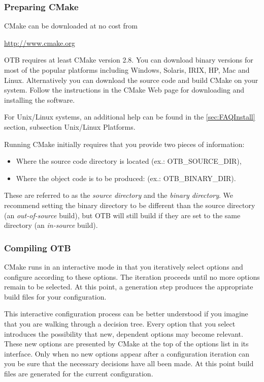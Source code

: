 \subsubsection{Preparing CMake}
\label{sec:CMakeforOTB}


CMake can be downloaded at no cost from
\begin{center}
  \url{http://www.cmake.org}
\end{center}

OTB requires at least CMake version 2.8. You can download binary
versions for most of the popular platforms including Windows, Solaris,
IRIX, HP, Mac and Linux. Alternatively you can download the source
code and build CMake on your system. Follow the instructions in the
CMake Web page for downloading and installing the software.

For Unix/Linux systems, an additional help can be found in the \ref{sec:FAQInstall}
section, subsection Unix/Linux Platforms.

Running CMake initially requires that you provide two pieces of
information: 
\begin{itemize}
\item Where the source code directory is located (ex.: OTB\_SOURCE\_DIR),
\item Where the object code is to be produced: (ex.: OTB\_BINARY\_DIR). 
\end{itemize}
These are referred to as the \emph{source directory} and the \emph{binary directory}.
We recommend setting the binary directory to be different than the source directory (an
\emph{out-of-source} build), but OTB will still build if they are set
to the same directory (an \emph{in-source} build). 

\subsubsection{Compiling OTB}
CMake runs in an interactive mode in that you iteratively select
options and configure according to these options. The iteration
proceeds until no more options remain to be selected. At this point, a
generation step produces the appropriate build files for your
configuration.

This interactive configuration process can be better understood if you
imagine that you are walking through a decision tree.  Every option that you
select introduces the possibility that new, dependent options may become
relevant. These new options are presented by CMake at the top of the options
list in its interface.  Only when no new options appear after a configuration
iteration can you be sure that the necessary decisions have all been made. At
this point build files are generated for the current configuration.

